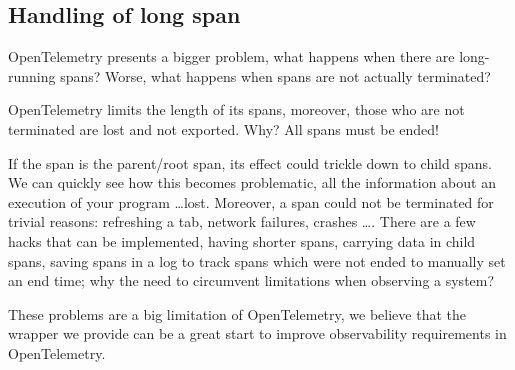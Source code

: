     \subsection{Handling of long span}
        OpenTelemetry presents a bigger problem, what happens when there are long-running spans? Worse, what happens when spans are not actually terminated?
        
        OpenTelemetry limits the length of its spans, moreover, those who are not terminated are lost and not exported. Why? All spans must be ended!

        If the span is the parent/root span, its effect could trickle down to child spans. We can quickly see how this becomes problematic, all the information about an execution of your program \dots lost. Moreover, a span could not be terminated for trivial reasons: refreshing a tab, network failures, crashes \dots \cite{otel-l}. There are a few hacks that can be implemented, having shorter spans, carrying data in child spans, saving spans in a log to track spans which were not ended to manually set an end time; why the need to circumvent limitations when observing a system?

        These problems are a big limitation of OpenTelemetry, we believe that the wrapper we provide can be a great start to improve observability requirements in OpenTelemetry.

